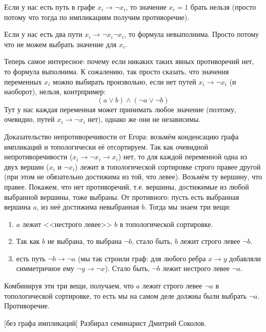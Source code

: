 	\begin{assertion}
		Если у нас есть путь в графе $x_i \to \lnot x_i$, то значение
		$x_i=1$ брать нельзя (просто потому что тогда по импликациям получим противоречие).
	\end{assertion}
	\begin{assertion}
		Если у нас есть два пути $x_i \to \lnot x_i \lnot x_i$, то формула невыполнима.
		Просто потому что не можем выбрать значение для $x_i$.
	\end{assertion}

	Теперь самое интересное: почему если никаких таких явных противоречий нет, то формула выполнима.
	К сожалению, так просто сказать, что значения переменных $x_i$ можно выбирать произвольно, если
	нет путей $x_i \to \lnot x_i$ (и наоборот), нельзя, контрпример:
	\[ (a \lor b) \land (\lnot a \lor \lnot b) \]
	Тут у нас каждая переменная может принимать любое значение (поэтому, очевидно, путей $x_i \to \lnot x_i$
	нет), однако же они не независимы.

	Доказательство непротиворечивости от Егора: возьмём конденсацию графа импликаций и топологически её отсортируем.
	Так как очевидной непротиворечивости ($x_i \to \lnot x_i \to x_i$) нет, то для 
	каждой переменной одна из двух вершин ($x_i$ и $\lnot x_i$) лежит в топологической сортировке строго правее другой
	(при этом не обязательно достижима из той, что левее).
	Возьмём ту вершину, что правее.
	Покажем, что нет противоречий, т.е. вершины, достижимые из любой выбранной вершины, тоже выбраны.
	От противного: пусть есть выбранная вершина $a$, из неё достижима невыбранная $b$.
	Тогда мы знаем три вещи:
	\begin{enumerate}
		\item $a$ лежит <<нестрого левее>> $b$ в топологической сортировке.
		\item Так как $b$ не выбрана, то выбрана $\lnot b$, стало быть, $b$ лежит строго левее $\lnot b$.
		\item
			есть путь $\lnot b \to \lnot a$ (мы так строили граф: для любого ребра $x \to y$
			добавляли симметричное ему $\lnot y \to \lnot x$).
			Стало быть, $\lnot b$ лежит нестрого левее $\lnot a$.
	\end{enumerate}
	Комбинируя эти три вещи, получаем, что $a$ лежит строго левее $\lnot a$ в топологической сортировке,
	то есть мы на самом деле должны были выбрать $\lnot a$.
	Противоречие.

[без графа импликаций]
	Разбирал семинарист Дмитрий Соколов.

